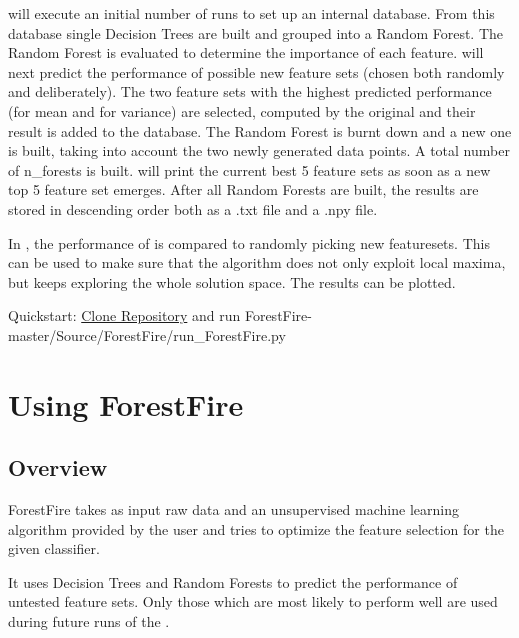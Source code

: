 \documentclass[letterpaper,10pt,english]{sphinxmanual}
\begin{document}
 will execute an initial  number of {\hyperref[\detokenize{Overview:mla}]{}} runs to set up an internal database. 
From this database single Decision Trees are built and grouped into a Random Forest. 
The Random Forest is evaluated to determine the importance of each feature.
 will next predict the performance of possible new feature sets (chosen both randomly and deliberately).
The two feature sets with the highest predicted performance (for mean and for variance) are selected, computed by the
original {\hyperref[\detokenize{Overview:mla}]{}} and their result is added to the database. 
The Random Forest is burnt down and a new one is built, taking into account the two newly generated data points. 
A total number of n\_forests is built.
 will print the current best 5 feature sets as soon as a new top 5 feature set emerges.
After all Random Forests are built, the results are stored in descending order both as a .txt file and a .npy file.

In , the performance of  is compared to randomly picking new featuresets.
This can be used to make sure that the algorithm does not only exploit local maxima, but keeps exploring the 
whole solution space.
The results can be plotted.

Quickstart: \href{https://github.com/weinertmos/ForestFire}{Clone Repository} and run ForestFire-master/Source/ForestFire/run\_ForestFire.py


\chapter{Using ForestFire}
\label{\detokenize{index:get-started}}\label{\detokenize{index:using-forestfire}}

\section{Overview}
\label{\detokenize{Overview:overview}}\label{\detokenize{Overview::doc}}\label{\detokenize{Overview:id1}}
ForestFire takes as input raw data and an unsupervised machine learning algorithm provided by the user and tries to optimize the feature selection for the given classifier.

It uses Decision Trees and Random Forests to predict the performance of untested feature sets. Only those which are most likely to perform well are used during future runs of the {\hyperref[\detokenize{Overview:term-machine-learning-algorithm}]{}}.
\end{document}
